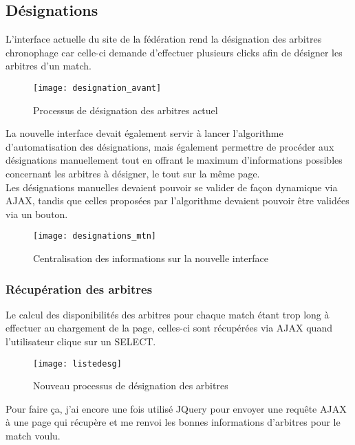 \subsection{Désignations}
\vspace{1cm}

L’interface actuelle du site de la fédération rend la désignation des arbitres chronophage car celle-ci demande d’effectuer plusieurs clicks afin de désigner les arbitres d’un match.

\begin{figure}[!h]
    \centering
    \texttt{[image: designation\_avant]}
    \caption{Processus de désignation des arbitres actuel}
\end{figure}

La nouvelle interface devait également servir à lancer l’algorithme d’automatisation des désignations, mais également permettre de procéder aux désignations manuellement tout en offrant le maximum d’informations possibles concernant les arbitres à désigner, le tout sur la même page. \\

Les désignations manuelles devaient pouvoir se valider de façon dynamique via AJAX, tandis que celles proposées par l’algorithme devaient pouvoir être validées via un bouton.

\begin{figure}[!h]
    \centering
    \texttt{[image: designations\_mtn]}
    \caption{Centralisation des informations sur la nouvelle interface}
\end{figure}

\newpage

\subsubsection{Récupération des arbitres}
\vspace{1cm}

Le calcul des disponibilités des arbitres pour chaque match étant trop long à effectuer au chargement de la page, celles-ci sont récupérées via AJAX quand l’utilisateur clique sur un SELECT.

\begin{figure}[!h]
    \centering
    \texttt{[image: listedesg]}
    \caption{Nouveau processus de désignation des arbitres}
\end{figure}

Pour faire ça, j’ai encore une fois utilisé JQuery pour envoyer une requête AJAX à une page qui récupère et me renvoi les bonnes informations d’arbitres pour le match voulu.

